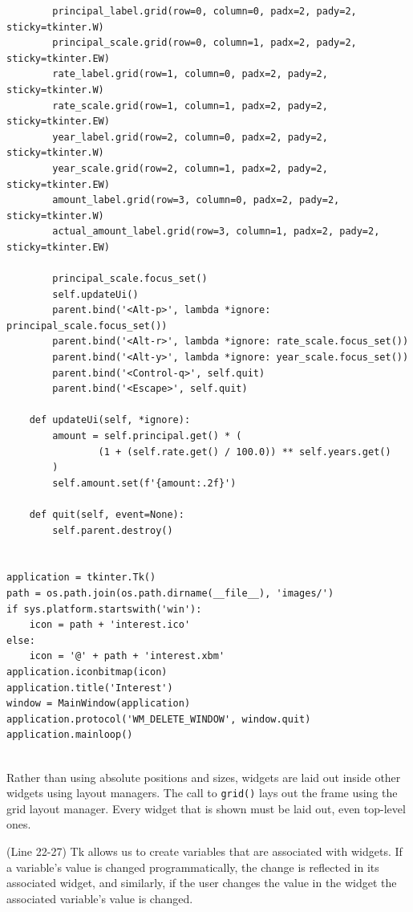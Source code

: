 \begin{lstlisting}
        principal_label.grid(row=0, column=0, padx=2, pady=2, sticky=tkinter.W)
        principal_scale.grid(row=0, column=1, padx=2, pady=2, sticky=tkinter.EW)
        rate_label.grid(row=1, column=0, padx=2, pady=2, sticky=tkinter.W)
        rate_scale.grid(row=1, column=1, padx=2, pady=2, sticky=tkinter.EW)
        year_label.grid(row=2, column=0, padx=2, pady=2, sticky=tkinter.W)
        year_scale.grid(row=2, column=1, padx=2, pady=2, sticky=tkinter.EW)
        amount_label.grid(row=3, column=0, padx=2, pady=2, sticky=tkinter.W)
        actual_amount_label.grid(row=3, column=1, padx=2, pady=2, sticky=tkinter.EW)

        principal_scale.focus_set()
        self.updateUi()
        parent.bind('<Alt-p>', lambda *ignore: principal_scale.focus_set())
        parent.bind('<Alt-r>', lambda *ignore: rate_scale.focus_set())
        parent.bind('<Alt-y>', lambda *ignore: year_scale.focus_set())
        parent.bind('<Control-q>', self.quit)
        parent.bind('<Escape>', self.quit)

    def updateUi(self, *ignore):
        amount = self.principal.get() * (
                (1 + (self.rate.get() / 100.0)) ** self.years.get()
        )
        self.amount.set(f'{amount:.2f}')

    def quit(self, event=None):
        self.parent.destroy()


application = tkinter.Tk()
path = os.path.join(os.path.dirname(__file__), 'images/')
if sys.platform.startswith('win'):
    icon = path + 'interest.ico'
else:
    icon = '@' + path + 'interest.xbm'
application.iconbitmap(icon)
application.title('Interest')
window = MainWindow(application)
application.protocol('WM_DELETE_WINDOW', window.quit)
application.mainloop()
  
\end{lstlisting}




Rather than using absolute positions and sizes, widgets are laid out inside other widgets using layout managers.
The call to \verb|grid()| lays out the frame using the grid layout manager.
Every widget that is shown must be laid out, even top-level ones.


(Line 22-27)
Tk allows us to create variables that are associated with widgets.
If a variable’s value is changed programmatically, the change is reflected in its associated widget, and similarly, if the user changes the value in the widget the associated variable’s value is changed.


